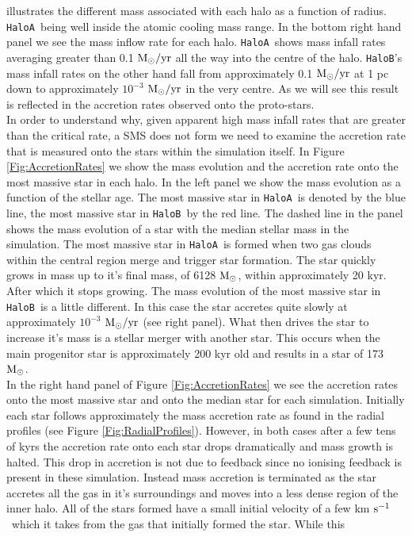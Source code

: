 \documentclass[graphics, twocolumn, usenatbib]{mn2e}
\newcommand{\kms} {km $\rm{s^{-1}}$}
\newcommand{\msolarc} {$\rm{M_{\odot}}$}
\newcommand{\msolaryr} {$\rm{M_{\odot}/yr}~$}
\newcommand{\ha} {\texttt{HaloA~}}
\newcommand{\hb} {\texttt{HaloB~}}
\newcommand{\hbc} {\texttt{HaloB}}
\begin{document}
illustrates the different mass associated with each halo as a function of radius. \ha being well
inside the atomic cooling mass range. In the bottom right hand panel we see the mass inflow rate for
each halo. \ha shows mass infall rates averaging greater than 0.1 \msolaryr all the way into the
centre of the halo. \hbc's mass infall rates on the other hand fall from approximately
0.1 \msolaryr at 1 pc down to approximately $10^{-3}$ \msolaryr in the very centre. As we will see
this result is reflected in the accretion rates observed onto the proto-stars. \\
\indent In order to understand why, given apparent high mass infall rates that are greater than the
critical rate, a SMS does not form we need to examine the accretion rate that is measured onto the
stars within the simulation itself. In Figure \ref{Fig:AccretionRates} we show the mass evolution and
the accretion rate onto the most massive star in each halo. In the left panel we show the mass
evolution as a function of the stellar age. The most massive star in \ha is denoted by the blue line,
the most massive star in \hb by the red line. The dashed line in the panel shows the mass evolution
of a star with the median stellar mass in the simulation. The most massive star in \ha is formed
when two gas clouds within the central region merge and trigger star formation. The star quickly
grows in mass up to it's final mass, of 6128 \msolarc, within approximately 20 kyr. After which
it stops growing. The mass evolution of the most massive star in
\hb is a little different. In this case the star accretes quite slowly at approximately $10^{-3}$
\msolaryr (see right panel). What then drives the star to increase it's mass is a stellar merger
with another star. This occurs when the main progenitor star is approximately 200 kyr old and
results in a star of 173 \msolarc. \\
\indent In the right hand panel of Figure \ref{Fig:AccretionRates} we see the accretion rates onto
the most massive star and onto the median star for each simulation. Initially each star follows approximately the mass accretion rate as found in the radial profiles (see Figure \ref{Fig:RadialProfiles}).
However, in both cases after a few tens of kyrs the accretion rate onto each star drops dramatically and mass growth is halted. This drop in accretion is not due to feedback since no ionising feedback
is present in these simulation. Instead mass accretion is terminated as the star accretes all the gas in it's surroundings and moves into a less dense region of the inner halo. All of the stars formed have a small initial velocity of a few \kms \ which it takes from the gas that initially formed the star. While this 
\end{document}
